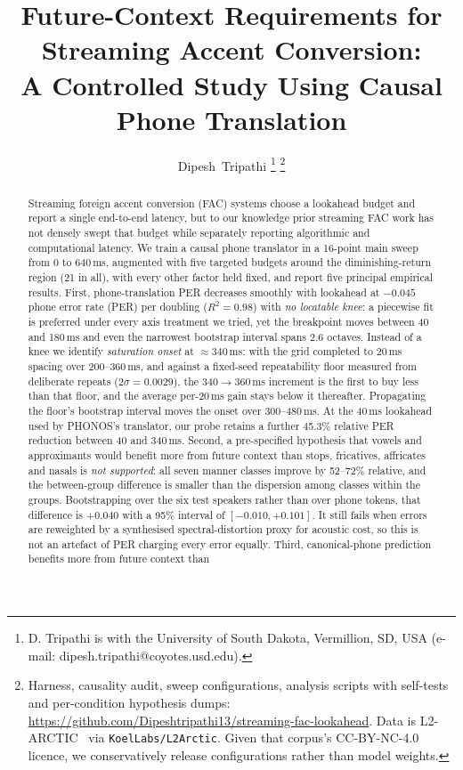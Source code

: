 \documentclass[journal]{IEEEtran}
\title{Future-Context Requirements for Streaming Accent Conversion:\\
A Controlled Study Using Causal Phone Translation}
\author{Dipesh~Tripathi%
\thanks{D. Tripathi is with the University of South Dakota, Vermillion, SD,
USA (e-mail: dipesh.tripathi@coyotes.usd.edu).}%
\thanks{Harness, causality audit, sweep configurations, analysis scripts with
self-tests and per-condition hypothesis dumps:
\url{https://github.com/Dipeshtripathi13/streaming-fac-lookahead}. Data is
L2-ARCTIC~\protect\cite{l2arctic2018} via \texttt{KoelLabs/L2Arctic}. Given
that corpus's CC-BY-NC-4.0 licence, we conservatively release configurations
rather than model weights.}}
\begin{document}
\maketitle



\begin{abstract}
\noindent
Streaming foreign accent conversion (FAC) systems choose a lookahead budget and
report a single end-to-end latency, but to our knowledge prior streaming FAC work has not densely swept that budget
while separately reporting algorithmic and computational latency. We train a causal phone translator in a 16-point main sweep from 0 to 640\,ms, augmented with five targeted budgets around the diminishing-return region (21 in all),
with every other factor held fixed, and report five principal empirical
results. First,
phone-translation PER decreases smoothly with lookahead at $-0.045$ phone error rate (PER) per
doubling ($R^2=0.98$) with \emph{no locatable knee}: a piecewise fit is
preferred under every axis treatment we tried, yet the breakpoint moves between
40 and 180\,ms and even the narrowest bootstrap interval spans 2.6 octaves.
Instead of a knee we identify \emph{saturation onset} at ${\approx}340$\,ms:
with the grid completed to 20\,ms spacing over 200--360\,ms, and against a
fixed-seed repeatability floor measured from deliberate repeats
($2\sigma=0.0029$), the $340\rightarrow360$\,ms increment is the first to buy
less than that floor, and the average per-20\,ms gain stays below it
thereafter. Propagating the floor's bootstrap interval moves the onset over
300--480\,ms. At the 40\,ms lookahead used by PHONOS's translator, our probe
retains a further 45.3\% relative PER reduction between 40 and 340\,ms.
Second, a pre-specified hypothesis that vowels and approximants would benefit
more from future context than stops, fricatives, affricates and nasals is
\emph{not supported}: all seven manner classes improve by
52--72\% relative, and the between-group difference is smaller than the
dispersion among classes within the groups. Bootstrapping over the six test
speakers rather than over phone tokens, that difference is $+0.040$ with a 95\%
interval of $[-0.010, +0.101]$. It still fails when errors are reweighted by a synthesised spectral-distortion
proxy for acoustic cost, so this is not an artefact of PER charging every error
equally. Third, canonical-phone prediction benefits more from future context than

\end{abstract}
\end{document}
